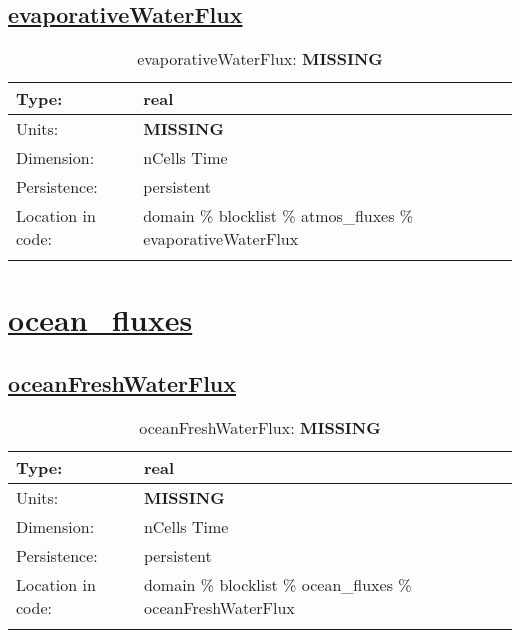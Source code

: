 \subsection[evaporativeWaterFlux]{\hyperref[sec:var_tab_atmos_fluxes]{evaporativeWaterFlux}}
\label{subsec:var_sec_atmos_fluxes_evaporativeWaterFlux}
\begin{center}
\begin{longtable}{| p{2.0in} | p{4.0in} |}
        \hline 
        Type: & real \\
        \hline 
        Units: & {\bf \color{red} MISSING} \\
        \hline 
        Dimension: & nCells Time \\
        \hline 
        Persistence: & persistent \\
        \hline 
         Location in code: & domain \% blocklist \% atmos\_fluxes \% evaporativeWaterFlux \\
         \hline 
    \caption{evaporativeWaterFlux: {\bf \color{red} MISSING}}
\end{longtable}
\end{center}
\section[ocean\_fluxes]{\hyperref[sec:var_tab_ocean_fluxes]{ocean\_fluxes}}
\label{sec:var_sec_ocean_fluxes}
\subsection[oceanFreshWaterFlux]{\hyperref[sec:var_tab_ocean_fluxes]{oceanFreshWaterFlux}}
\label{subsec:var_sec_ocean_fluxes_oceanFreshWaterFlux}
\begin{center}
\begin{longtable}{| p{2.0in} | p{4.0in} |}
        \hline 
        Type: & real \\
        \hline 
        Units: & {\bf \color{red} MISSING} \\
        \hline 
        Dimension: & nCells Time \\
        \hline 
        Persistence: & persistent \\
        \hline 
         Location in code: & domain \% blocklist \% ocean\_fluxes \% oceanFreshWaterFlux \\
         \hline 
    \caption{oceanFreshWaterFlux: {\bf \color{red} MISSING}}
\end{longtable}
\end{center}
